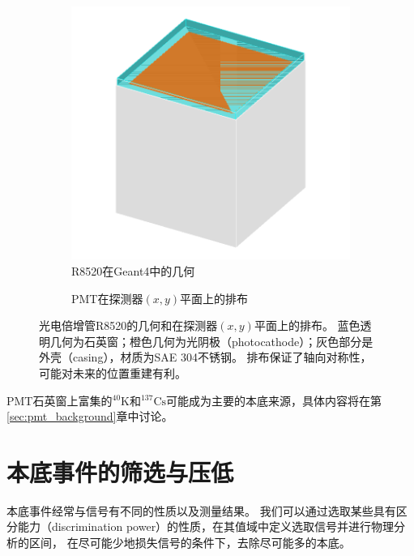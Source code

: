 \begin{figure}
  \begin{subfigure}{.53\textwidth}
    \centering
    \includegraphics[width=1.0\linewidth]{figures/pmt_geo.png}
    \caption{\label{fig:pmt_g4} R8520在Geant4中的几何}
  \end{subfigure}
  \begin{subfigure}{.47\textwidth}
    \centering
    
    \caption{\label{fig:pmt_layout} PMT在探测器$(x,y)$平面上的排布}
  \end{subfigure}
  \caption{\label{fig:pmt_geo} 光电倍增管R8520的几何和在探测器$(x,y)$平面上的排布。
  蓝色透明几何为石英窗；橙色几何为光阴极（photocathode）；灰色部分是外壳（casing），材质为SAE 304不锈钢。
  排布保证了轴向对称性，可能对未来的位置重建有利。}
\end{figure}

PMT石英窗上富集的${}^{40}\mathrm{K}$和${}^{137}\mathrm{Cs}$可能成为主要的本底来源，具体内容将在第\ref{sec:pmt_background}章中讨论。

\section{本底事件的筛选与压低}

本底事件经常与信号有不同的性质以及测量结果。
我们可以通过选取某些具有区分能力（discrimination power）的性质，在其值域中定义选取信号并进行物理分析的区间，
在尽可能少地损失信号的条件下，去除尽可能多的本底。

